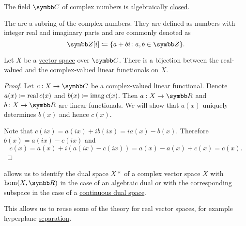 \begin{theorem}\label{thm:fundamental_theorem_of_algebra}
  The field \( \BC \) of complex numbers is algebraically \hyperref[def:algebraically_closed_field]{closed}.
\end{theorem}

\begin{definition}\label{def:gaussian_integers}
  The  are a subring of the complex numbers. They are defined as numbers with integer real and imaginary parts and are commonly denoted as
  \begin{equation*}
    \BZ[i] \coloneqq \{ a + bi \colon a, b \in \BZ \}.
  \end{equation*}
\end{definition}

\begin{theorem}\label{thm:linear_functionals_over_c}
  Let \( X \) be a \hyperref[def:vector_space]{vector space} over \( \BC \). There is a bijection between the real-valued and the complex-valued linear functionals on \( X \).
\end{theorem}
\begin{proof}
  Let \( c: X \to \BC \) be a complex-valued linear functional. Denote \( a(x) \coloneqq \operatorname{real} c(x) \) and \( b(x) \coloneqq \operatorname{imag} c(x) \). Then \( a: X \to \BR \) and \( b: X \to \BR \) are linear functionals. We will show that \( a(x) \) uniquely determines \( b(x) \) and hence \( c(x) \).

  Note that \( c(ix) = a(ix) + i b(ix) = i a(x) - b(x) \). Therefore \( b(x) = a(ix) - c(ix) \) and
  \begin{equation*}
    c(x) = a(x) + i (a(ix) - c(ix)) = a(x) - a(x) + c(x) = c(x).
  \end{equation*}
\end{proof}

\begin{remark}\label{rem:linear_functionals_over_c}
   allows us to identify the dual space \( X* \) of a complex vector space \( X \) with \( \Hom(X, \BR) \) in the case of an algebraic \hyperref[def:dual_vector_space]{dual} or with the corresponding subspace in the case of a \hyperref[def:continuous_dual_space]{continuous dual space}.

  This allows us to reuse some of the theory for real vector spaces, for example hyperplane \hyperref[def:hyperplane_separation]{separation}.
\end{remark}
